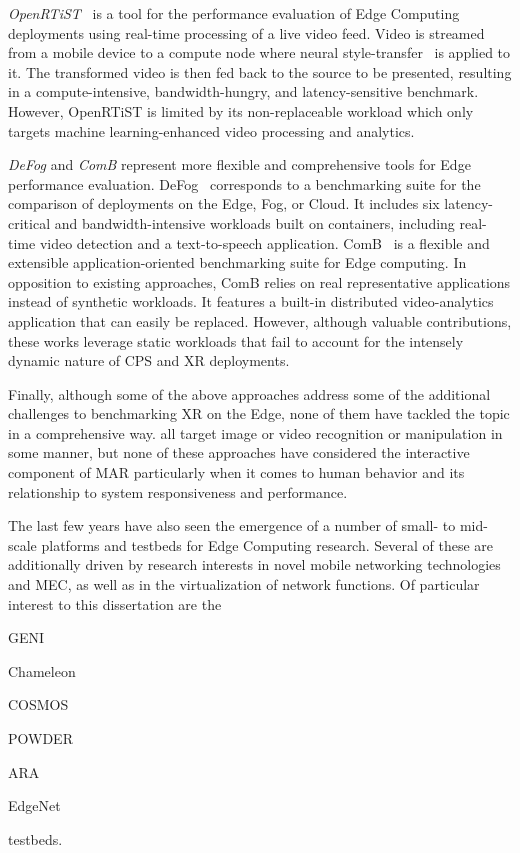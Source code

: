 \emph{OpenRTiST}~\cite{george2020openrtist} is a tool for the performance evaluation of Edge Computing deployments using real-time processing of a live video feed.
Video is streamed from a mobile device to a compute node where neural style-transfer~\cite{gatys2016image} is applied to it.
The transformed video is then fed back to the source to be presented, resulting in a compute-intensive, bandwidth-hungry, and latency-sensitive benchmark.
However, OpenRTiST is limited by its non-replaceable workload which only targets machine learning-enhanced video processing and analytics.

\emph{DeFog} and \emph{ComB} represent more flexible and comprehensive tools for Edge performance evaluation.
DeFog~\cite{mcchesney2019defog} corresponds to a benchmarking suite for the comparison of deployments on the Edge, Fog, or Cloud.
It includes six latency-critical and bandwidth-intensive workloads built on containers, including real-time video detection and a text-to-speech application.
ComB~\cite{baurle2022comb} is a flexible and extensible application-oriented benchmarking suite for Edge computing.
In opposition to existing approaches, ComB relies on real representative applications instead of synthetic workloads.
It features a built-in distributed video-analytics application that can easily be replaced.
However, although valuable contributions, these works leverage static workloads that fail to account for the intensely dynamic nature of \gls{CPS} and \gls{XR} deployments.

Finally, although some of the above approaches address some of the additional challenges to benchmarking \gls{XR} on the Edge, none of them have tackled the topic in a comprehensive way.\@
\cite{das2018edgebench,mcchesney2019defog,baurle2022comb,george2020openrtist} all target image or video recognition or manipulation in some manner, but none of these approaches have considered the interactive component of \gls{MAR} particularly when it comes to human behavior and its relationship to system responsiveness and performance.

\medskip

The last few years have also seen the emergence of a number of small- to mid-scale platforms and testbeds for Edge Computing research.
Several of these are additionally driven by research interests in novel mobile networking technologies and \gls{MEC}, as well as in the virtualization of network functions.
Of particular interest to this dissertation are the
\begin{inlineenum}
    \item \acs{GENI}
    \item Chameleon
    \item \acs{COSMOS}
    \item \acs{POWDER}
    \item \acs{ARA}
    \item EdgeNet
\end{inlineenum} testbeds.

